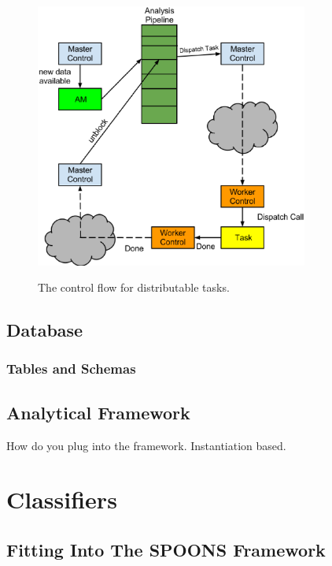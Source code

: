 \documentclass[12pt]{ucthesis}
\newcommand{\captionfonts}{\small\bf\ssp}
\begin{document}
\begin{figure}
   \begin{center}
      \includegraphics[width=0.8\textwidth]{images/SPOONS_Distributable_Task_Control_Flow.eps}
      \captionfonts
      \caption[SPOONS Distributable Task Flow]{The control flow for distributable tasks.}
      \label{fig:serverArch}
   \end{center}
\end{figure}

\section{Database}
\label{arch-database}

\subsection{Tables and Schemas}
\label{arch-database-tables}

\section{Analytical Framework}
\label{arch-framework}
How do you plug into the framework.
Instantiation based.

\chapter{Classifiers}
\label{classifiers}

\section{Fitting Into The SPOONS Framework}
\label{class-framework}
\end{document}
